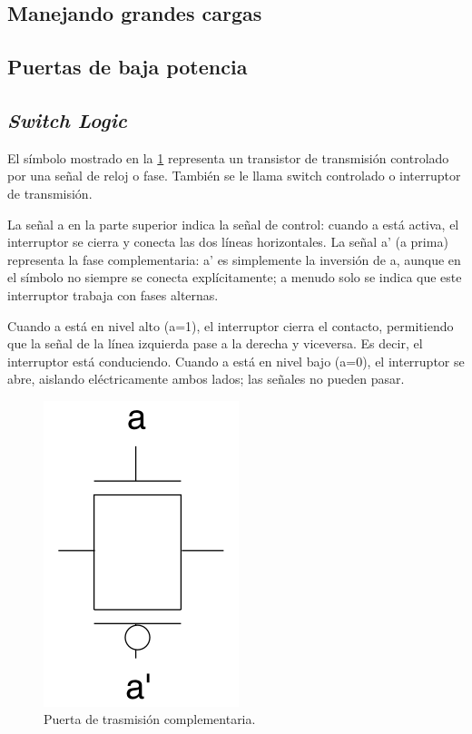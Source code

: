 \subsection{Manejando grandes cargas}

\subsection{Puertas de baja potencia}

\subsection{\textit{Switch Logic}}


El símbolo mostrado en la  \cref{Fig:02-switch} representa un transistor de transmisión controlado por una señal de reloj o fase. También se le llama switch controlado o interruptor de transmisión.

La señal a en la parte superior indica la señal de control: cuando a está activa, el interruptor se cierra y conecta las dos líneas horizontales. La señal a' (a prima) representa la fase complementaria: a' es simplemente la inversión de a, aunque en el símbolo no siempre se conecta explícitamente; a menudo solo se indica que este interruptor trabaja con fases alternas.

Cuando a está en nivel alto (a=1), el interruptor cierra el contacto, permitiendo que la señal de la línea izquierda pase a la derecha y viceversa. Es decir, el interruptor está conduciendo. Cuando a está en nivel bajo (a=0), el interruptor se abre, aislando eléctricamente ambos lados; las señales no pueden pasar.

\begin{figure}[H] \centering
    \includegraphics[width=0.3\linewidth]{Imagenes/02-Switch}
    \caption{Puerta de trasmisión complementaria.}
    \label{Fig:02-switch}
\end{figure}

